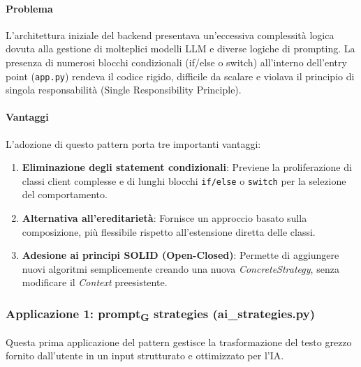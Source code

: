 \documentclass[11pt,a4paper]{article}
\newcommand{\gls}[1]{#1\textsubscript{G}}
\begin{document}
\paragraph{Problema}
L’architettura iniziale del backend presentava un'eccessiva complessità logica dovuta alla gestione di molteplici modelli LLM e diverse logiche di prompting. La presenza di numerosi blocchi condizionali (if/else o switch) all'interno dell'entry point (\texttt{app.py}) rendeva il codice rigido, difficile da scalare e violava il principio di singola responsabilità (Single Responsibility Principle).

\paragraph{Vantaggi}
L'adozione di questo pattern porta tre importanti vantaggi:
\begin{enumerate}
    \item \textbf{Eliminazione degli statement condizionali}: Previene la proliferazione di classi client complesse e di lunghi blocchi \texttt{if/else} o \texttt{switch} per la selezione del comportamento.
    \item \textbf{Alternativa all'ereditarietà}: Fornisce un approccio basato sulla composizione, più flessibile rispetto all'estensione diretta delle classi.
    \item \textbf{Adesione ai principi SOLID (Open-Closed)}: Permette di aggiungere nuovi algoritmi semplicemente creando una nuova \textit{ConcreteStrategy}, senza modificare il \textit{Context} preesistente.
\end{enumerate}

\subsubsection{Applicazione 1: \gls{prompt} strategies (ai\_strategies.py)}
Questa prima applicazione del pattern gestisce la trasformazione del testo grezzo fornito dall'utente in un input strutturato e ottimizzato per l'IA.
\end{document}
